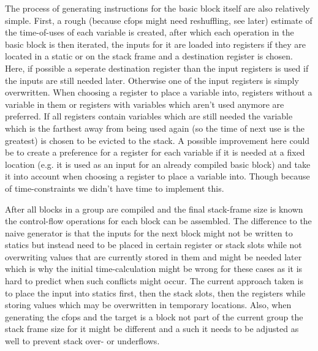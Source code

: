\documentclass[course=eragp]{aspdoc}
\begin{document}
\par

The process of generating instructions for the basic block itself are also relatively simple. First, a rough (because cfops might need reshuffling, see later) estimate of the time-of-uses of each variable is created, 
after which each operation in the basic block is then iterated, the inputs for it are loaded into registers if they are located in a static or on the stack frame and a destination register is chosen.
Here, if possible a seperate destination register than the input registers is used if the inputs are still needed later. Otherwise one of the input registers is simply overwritten.
When choosing a register to place a variable into, registers without a variable in them or registers with variables which aren't used anymore are preferred. If all registers contain variables which are still needed
the variable which is the farthest away from being used again (so the time of next use is the greatest) is chosen to be evicted to the stack.
A possible improvement here could be to create a preference for a register for each variable if it is needed at a fixed location (e.g. it is used as an input for an already compiled basic block) 
and take it into account when choosing a register to place a variable into. Though because of time-constraints we didn't have time to implement this.

\par

After all blocks in a group are compiled and the final stack-frame size is known the control-flow operations for each block can be assembled.
The difference to the naive generator is that the inputs for the next block might not be written to statics but instead need to be placed in certain register or stack slots
while not overwriting values that are currently stored in them and might be needed later which is why the initial time-calculation might be wrong for these cases as it is hard to predict when such
conflicts might occur. The current approach taken is to place the input into statics first, then the stack slots, then the registers while storing values which may be overwritten in temporary locations.
Also, when generating the cfops and the target is a block not part of the current group the stack frame size for it might be different and a such it needs to be adjusted as well to prevent stack over- or underflows.


\end{document}

